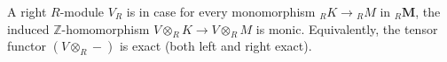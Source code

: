 A right $R$-module $V_R$ is  in case for every monomorphism ${}_R K \to {}_R M$ in ${}_R\mathbf{M}$, the induced $\mathbb{Z}$-homomorphism $V \otimes_R K \to V \otimes_R M$ is monic. Equivalently, the tensor functor $(V \otimes_R -)$ is exact (both left and right exact).
